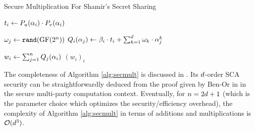 \documentclass{llncs}
\begin{document}
\begin{algorithm}
\caption{Secure Multiplication For Shamir's Secret Sharing}
\label{alg:secmult}
\begin{algorithmic}[1]


\State $t_i \leftarrow P_u(\pubElt)\cdot P_{v}(\pubElt)$
\EndFor

\State $\omega_j \leftarrow \texttt{rand}(\GFn)$
\EndFor
{}
\State $Q_i(\pubElt[j]) \leftarrow \beta_i \cdot t_i +
      \sum_{k=1}^{\order} \omega_k\cdot \pubElt[j]^k$ \label{step:reshare}   	
\EndFor  	
\EndFor
   	
\State $w_i \leftarrow \sum_{j=1}^{\nbShares} Q_j(\pubElt)$
\EndFor
\Return $(w_i)_i$
\end{algorithmic}
\end{algorithm}



The completeness of Algorithm \ref{alg:secmult} is discussed in \cite{BGW88}. Its $\order$\myth-order SCA security can be straightforwardly deduced from the proof given by Ben-Or \etal in \cite{BGW88} in the secure multi-party computation context. Eventually, for $\nbShares=2\order+1$ (which is the parameter choice which optimizes the security/efficiency overhead), the complexity of Algorithm \ref{alg:secmult} in terms of additions and multiplications is ${\cal O}(\order^3)$.
\end{document}
